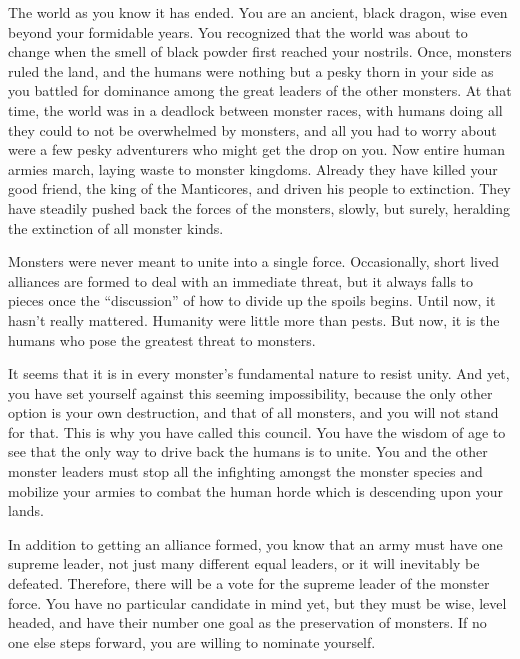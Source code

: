 \documentclass[char]{guildcamp2}
\begin{document}
\name{\cOnyx{}}


	The world as you know it has ended. You are an ancient, black dragon, wise even beyond your formidable years. You recognized that the world was about to change when the smell of black powder first reached your nostrils. Once, monsters ruled the land, and the humans were nothing but a pesky thorn in your side as you battled for dominance among the great leaders of the other monsters. At that time, the world was in a deadlock between monster races, with humans doing all they could to not be overwhelmed by monsters, and all you had to worry about were a few pesky adventurers who might get the drop on you. Now entire human armies march, laying waste to monster kingdoms. Already they have killed your good friend, the king of the Manticores, and driven his people to extinction. They have steadily pushed back the forces of the monsters, slowly, but surely, heralding the extinction of all monster kinds. 
	
Monsters were never meant to unite into a single force. Occasionally, short lived alliances are formed to deal with an immediate threat, but it always falls to pieces once the ``discussion'' of how to divide up the spoils begins. Until now, it hasn't really mattered. Humanity were little more than pests. But now, it is the humans who pose the greatest threat to monsters. 
	
It seems that it is in every monster's fundamental nature to resist unity. And yet, you have set yourself against this seeming impossibility, because the only other option is your own destruction, and that of all monsters, and you will not stand for that. This is why you have called this council. You have the wisdom of age to see that the only way to drive back the humans is to unite. You and the other monster leaders must stop all the infighting amongst the monster species and mobilize your armies to combat the human horde which is descending upon your lands.  
	
In addition to getting an alliance formed, you  know that an army must have one supreme leader, not just many different equal leaders, or it will inevitably be defeated. Therefore, there will be a vote for the supreme leader of the monster force. You have no particular candidate in mind yet, but they must be wise, level headed, and have their number one goal as the preservation of monsters. If no one else steps forward, you are willing to nominate yourself.
	
\end{document}

